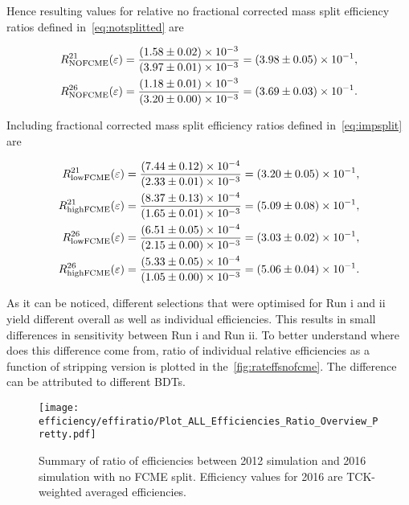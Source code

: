 Hence resulting values for relative no fractional corrected mass split efficiency ratios defined in~\autoref{eq:notsplitted} are

\begin{equation}
\begin{aligned}
	R^{21}_{\rm{NOFCME}}(\varepsilon)=\frac{(1.58\pm0.02)\times 10 ^{-3 }}{(3.97\pm0.01)\times 10 ^{-3 }}=(3.98\pm0.05)\times 10 ^{-1 },\\
	R^{26}_{\rm{NOFCME}}(\varepsilon)=\frac{(1.18\pm0.01)\times 10 ^{-3 }}{(3.20\pm0.00)\times 10 ^{-3 }}=(3.69\pm0.03)\times 10 ^{-1 }.
\end{aligned}
\label{eq:nofcmeer}
\end{equation}


Including fractional corrected mass split efficiency ratios defined in~\autoref{eq:impsplit} are

\begin{equation}
\begin{aligned}
	R^{21}_{\rm{lowFCME}}(\varepsilon)=\frac{(7.44\pm0.12)\times 10 ^{-4 }}{(2.33\pm0.01)\times 10 ^{-3 }}=(3.20\pm0.05)\times 10 ^{-1 },\\
	R^{21}_{\rm{highFCME}}(\varepsilon)=\frac{(8.37\pm0.13)\times 10 ^{-4 }}{(1.65\pm0.01)\times 10 ^{-3 }}=(5.09\pm0.08)\times 10 ^{-1 },\\
	R^{26}_{\rm{lowFCME}}(\varepsilon)=\frac{(6.51\pm0.05)\times 10 ^{-4 }}{(2.15\pm0.00)\times 10 ^{-3 }}=(3.03\pm0.02)\times 10 ^{-1 },\\
	R^{26}_{\rm{highFCME}}(\varepsilon)=\frac{(5.33\pm0.05)\times 10 ^{-4 }}{(1.05\pm0.00)\times 10 ^{-3 }}=(5.06\pm0.04)\times 10 ^{-1 }.
\end{aligned}
\label{eq:allfcmeer}
\end{equation}
	
	
As it can be noticed, different selections that were optimised for Run \Rn{1} and \Rn{2} yield different overall as well as individual efficiencies. This results in small differences in sensitivity between Run \Rn{1} and Run \Rn{2}. To better understand where does this difference come from, ratio of individual relative efficiencies as a function of stripping version is plotted in the~\autoref{fig:rateffsnofcme}. The difference can be attributed to different BDTs.

\begin{figure}[H]
\centering
\texttt{[image: efficiency/effiratio/Plot\_ALL\_Efficiencies\_Ratio\_Overview\_Pretty.pdf]}
\caption{Summary of ratio of efficiencies between 2012 simulation and 2016 simulation with no FCME split. Efficiency values for 2016 are TCK-weighted averaged efficiencies.}
\centering
\label{fig:rateffsnofcme}
\end{figure}


